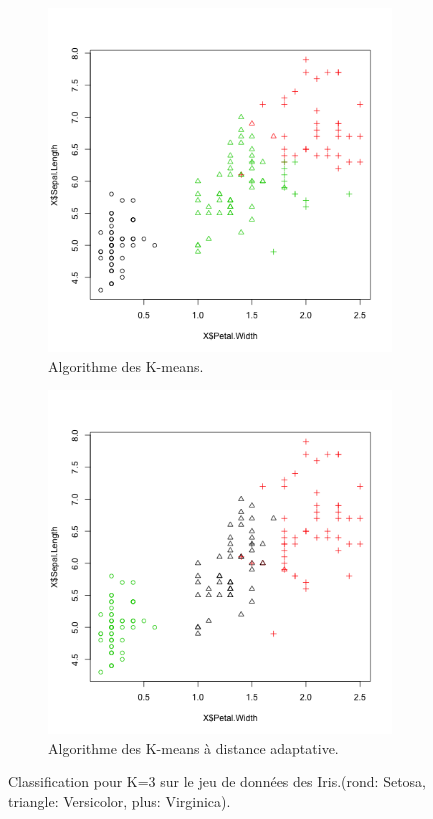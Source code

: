 \documentclass[a4paper,11pt,oneside,roman]{article}
\begin{document}
    \begin{figure}
        \centering
        \begin{subfigure}{.5\textwidth}
          \centering
          \includegraphics[width=.8\linewidth]{imgs/K_means_iris_3_sepal_petal.png}
          \caption{Algorithme des K-means.}
        \end{subfigure}%
        \begin{subfigure}{.5\textwidth}
          \centering
          \includegraphics[width=.8\linewidth]{imgs/K_means_adapt_iris_3_sepal_petal.png}
          \caption{Algorithme des K-means à distance adaptative.}
        \end{subfigure}
        \caption{Classification pour K=3 sur le jeu de données des Iris.(rond: Setosa, triangle: Versicolor, plus: Virginica).}
        \label{fig_Iris_3_sepal_petal}
    \end{figure}


    
\end{document}
